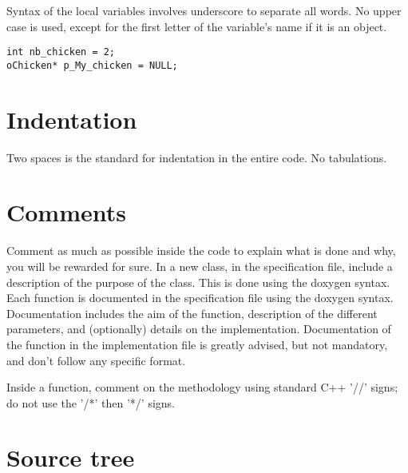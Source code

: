 \documentclass[a4paper, 11pt]{article}
\begin{document}
Syntax of the local variables involves underscore to separate all words. No upper case is used, except for the first letter of the variable's name if it is an object.

\begin{lstlisting}[label={local_variables},caption=Examples of local variables naming.]
int nb_chicken = 2;
oChicken* p_My_chicken = NULL;
\end{lstlisting}

\section{Indentation}

Two spaces is the standard for indentation in the entire code. No tabulations.

\section{Comments}

Comment as much as possible inside the code to explain what is done and why, you will be rewarded for sure.
In a new class, in the specification file, include a description of the purpose of the class. This is done using the doxygen syntax.
Each function is documented in the specification file using the doxygen syntax. Documentation includes the aim of the function, description of the different parameters, and (optionally) details on the implementation. Documentation of the function in the implementation file is greatly advised, but not mandatory, and don't follow any specific format.

Inside a function, comment on the methodology using standard C++ '//' signs; do not use the '/*' then '*/' signs.

\section{Source tree}
\end{document}
